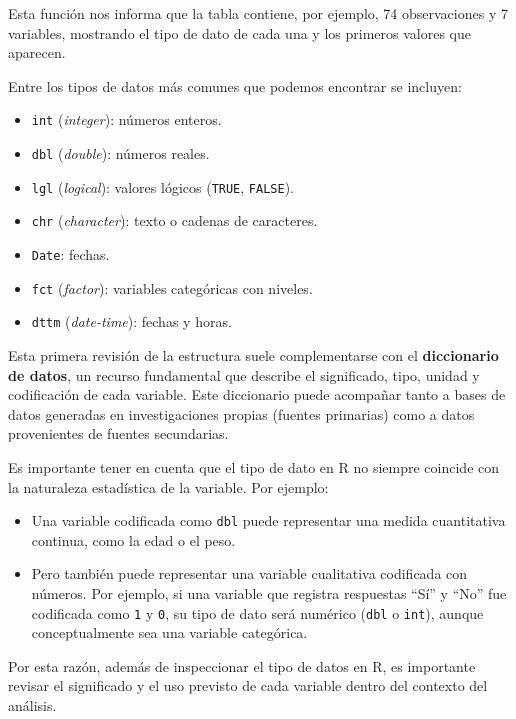 \documentclass[
  spanish,
  letterpaper,
  DIV=11,
  numbers=noendperiod]{scrreprt}
\begin{document}
Esta función nos informa que la tabla contiene, por ejemplo, 74
observaciones y 7 variables, mostrando el tipo de dato de cada una y los
primeros valores que aparecen.

Entre los tipos de datos más comunes que podemos encontrar se incluyen:

\begin{itemize}
\item
  \texttt{int} (\emph{integer}): números enteros.
\item
  \texttt{dbl} (\emph{double}): números reales.
\item
  \texttt{lgl} (\emph{logical}): valores lógicos (\texttt{TRUE},
  \texttt{FALSE}).
\item
  \texttt{chr} (\emph{character}): texto o cadenas de caracteres.
\item
  \texttt{Date}: fechas.
\item
  \texttt{fct} (\emph{factor}): variables categóricas con niveles.
\item
  \texttt{dttm} (\emph{date-time}): fechas y horas.
\end{itemize}

Esta primera revisión de la estructura suele complementarse con el
\textbf{diccionario de datos}, un recurso fundamental que describe el
significado, tipo, unidad y codificación de cada variable. Este
diccionario puede acompañar tanto a bases de datos generadas en
investigaciones propias (fuentes primarias) como a datos provenientes de
fuentes secundarias.

Es importante tener en cuenta que el tipo de dato en R no siempre
coincide con la naturaleza estadística de la variable. Por ejemplo:

\begin{itemize}
\item
  Una variable codificada como \texttt{dbl} puede representar una medida
  cuantitativa continua, como la edad o el peso.
\item
  Pero también puede representar una variable cualitativa codificada con
  números. Por ejemplo, si una variable que registra respuestas ``Sí'' y
  ``No'' fue codificada como \texttt{1} y \texttt{0}, su tipo de dato
  será numérico (\texttt{dbl} o \texttt{int}), aunque conceptualmente
  sea una variable categórica.
\end{itemize}

Por esta razón, además de inspeccionar el tipo de datos en R, es
importante revisar el significado y el uso previsto de cada variable
dentro del contexto del análisis.
\end{document}
